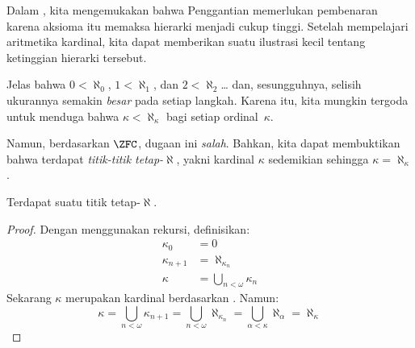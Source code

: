 \documentclass[../../../include/open-logic-section]{subfiles}
\begin{document}

Dalam , kita mengemukakan bahwa Penggantian memerlukan
pembenaran karena aksioma itu memaksa hierarki menjadi cukup tinggi. Setelah
mempelajari aritmetika kardinal, kita dapat memberikan suatu ilustrasi kecil
tentang ketinggian hierarki tersebut.

Jelas bahwa $0 < \aleph_0$, $1 < \aleph_1$, dan $2 < \aleph_2$\ldots{}
dan, sesungguhnya, selisih ukurannya semakin \emph{besar} pada setiap
langkah. Karena itu, kita mungkin tergoda untuk menduga bahwa
$\kappa<\aleph_\kappa$ bagi setiap ordinal~$\kappa$.

Namun, berdasarkan $\ZFC$, dugaan ini \emph{salah}. Bahkan, kita dapat
membuktikan bahwa terdapat \emph{titik-titik tetap-$\aleph$}, yakni kardinal
$\kappa$ sedemikian sehingga $\kappa=\aleph_\kappa$.

\begin{prop}
Terdapat suatu titik tetap-$\aleph$.
\end{prop}

\begin{proof}
Dengan menggunakan rekursi, definisikan:
\begin{align*}
	\kappa_0 &= 0\\
	\kappa_{n+1} &= \aleph_{\kappa_n}\\
	\kappa&= \bigcup_{n < \omega}\kappa_n
\end{align*}
Sekarang $\kappa$ merupakan kardinal berdasarkan
. Namun:
\[
	\kappa= \bigcup_{n < \omega} \kappa_{n+1} =
	\bigcup_{n < \omega}\aleph_{\kappa_n} =
	\bigcup_{\alpha < \kappa}\aleph_\alpha = \aleph_\kappa
\]
\end{proof}
\end{document}
